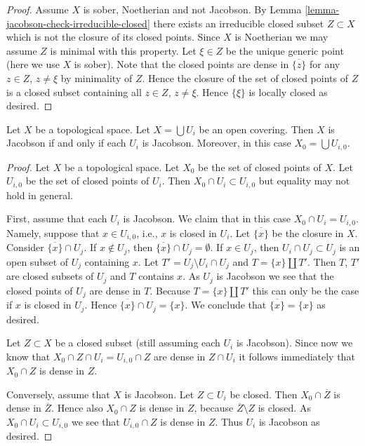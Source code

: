 \begin{proof}
Assume $X$ is sober, Noetherian and not Jacobson.
By Lemma \ref{lemma-jacobson-check-irreducible-closed} there exists
an irreducible closed subset $Z \subset X$ which is not the closure
of its closed points. Since $X$ is Noetherian we may assume $Z$ is
minimal with this property. Let $\xi \in Z$ be the unique generic point
(here we use $X$ is sober). Note that the closed points are dense in
$\overline{\{z\}}$ for any $z \in Z$, $z \not = \xi$ by minimality
of $Z$. Hence the closure of the set of closed points of $Z$ is
a closed subset containing all $z \in Z$, $z \not = \xi$. Hence
$\{\xi\}$ is locally closed as desired.
\end{proof}

\begin{lemma}
\label{lemma-jacobson-local}
Let $X$ be a topological space.
Let $X = \bigcup U_i$ be an open covering.
Then $X$ is Jacobson if and only if each $U_i$ is Jacobson.
Moreover, in this case $X_0 = \bigcup U_{i, 0}$.
\end{lemma}

\begin{proof}
Let $X$ be a topological space.
Let $X_0$ be the set of closed points of $X$.
Let $U_{i, 0}$ be the set of closed points of
$U_i$. Then $X_0 \cap U_i \subset U_{i, 0}$
but equality may not hold in general.

\medskip\noindent
First, assume that each $U_i$ is Jacobson.
We claim that in this case $X_0 \cap U_i = U_{i, 0}$.
Namely, suppose that $x \in U_{i, 0}$, i.e., $x$ is closed in
$U_i$. Let $\overline{\{x\}}$ be the closure
in $X$. Consider $\overline{\{x\}} \cap U_j$.
If $x \not \in U_j$, then $\overline{\{x\}} \cap U_j = \emptyset$.
If $x \in U_j$, then $U_i \cap U_j \subset U_j$
is an open subset of $U_j$ containing $x$.
Let $T' = U_j \setminus U_i \cap U_j$ and
$T = \{x\} \coprod T'$. Then $T$, $T'$
are closed subsets of $U_j$ and $T$ contains
$x$. As $U_j$ is Jacobson we see that the closed points of
$U_j$ are dense in $T$. Because $T = \{x\} \coprod T'$
this can only be the case if $x$ is closed in $U_j$.
Hence $\overline{\{x\}} \cap U_j = \{x\}$. We conclude
that $\overline{\{x\}} = \{ x \}$ as desired.

\medskip\noindent
Let $Z \subset X$ be a closed subset (still
assuming each $U_i$ is Jacobson).
Since now we know that $X_0 \cap Z  \cap U_i
= U_{i, 0} \cap Z$ are dense in $Z \cap U_i$
it follows immediately that $X_0 \cap Z$ is
dense in $Z$.

\medskip\noindent
Conversely, assume that $X$ is Jacobson.
Let $Z \subset U_i$ be closed. Then
$X_0 \cap \overline{Z}$ is dense in $\overline{Z}$.
Hence also $X_0 \cap Z$ is dense in $Z$, because
$\overline{Z} \setminus Z$ is closed. As $X_0 \cap U_i
\subset U_{i, 0}$ we see that
$U_{i, 0} \cap Z$ is dense in $Z$.
Thus $U_i$ is Jacobson as desired.
\end{proof}

